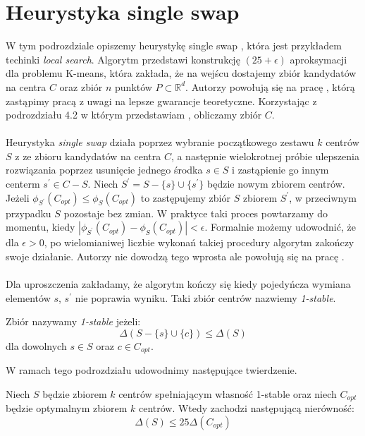 \section{Heurystyka single swap}

W tym podrozdziale opiszemy heurystykę single swap \cite{Arya2004LocalSH}, która jest przykładem techinki \textit{local search}.
Algorytm przedstawi konstrukcję $(25 + \epsilon)$ aproksymacji dla problemu K-means, która zakłada, że na wejścu dostajemy zbiór kandydatów na centra $C$ oraz zbiór $n$ punktów $P \subset \mathbb{R}^d$.
Autorzy powołują się na pracę \cite{Matousek99onapproximate}, którą zastąpimy pracą \cite{10.1145/1007352.1007400} z uwagi na lepsze gwarancje teoretyczne.
Korzystając z podrozdziału 4.2 w którym przedstawiam \cite{10.1145/1007352.1007400}, obliczamy zbiór $C$.
\\~\\
Heurystyka \textit{single swap} działa poprzez wybranie początkowego zestawu $k$ centrów $S$ z ze zbioru kandydatów na centra $C$, a następnie wielokrotnej
próbie ulepszenia rozwiązania poprzez usunięcie jednego środka $s \in S$ i zastąpienie go innym centerm $s^{'} \in C - S$.
Niech $S^{'} = S - \{s\} \cup \{s^{'}\}$ będzie nowym zbiorem centrów.
Jeżeli $\phi_{S^{'}}(C_{opt}) \leq \phi_{S}(C_{opt})$ to zastępujemy zbiór $S$ zbiorem $S^{'}$, w przeciwnym przypadku $S$ pozostaje bez zmian.
W praktyce taki proces powtarzamy do momentu, kiedy $|\phi_{S^{'}}(C_{opt}) - \phi_{S}(C_{opt})| < \epsilon$.
Formalnie możemy udowodnić, że dla $\epsilon > 0$, po wielomianiwej liczbie wykonań takiej procedury algorytm zakończy swoje działanie.
Autorzy nie dowodzą tego wprosta ale powołują się na pracę \cite{10.1145/380752.380755}.
\\~\\
Dla uproszczenia zakładamy, że algorytm kończy się kiedy pojedyńcza wymiana elementów $s$, $s^{'}$ nie poprawia wyniku.
Taki zbiór centrów nazwiemy \textit{1-stable}.
\begin{definition}
    Zbiór nazywamy \emph{1-stable} jeżeli:
    \begin{equation}
        \Delta(S - \{s\} \cup \{c\}) \leq \Delta(S)
    \end{equation}
    dla dowolnych $s \in S$ oraz $c \in C_{opt}$.
\end{definition}

\noindent
W ramach tego podrozdziału udowodnimy następujące twierdzenie.

\begin{thm}
    Niech $S$ będzie zbiorem $k$ centrów spełniającym własność 1-stable oraz niech $C_{opt}$ będzie optymalnym zbiorem $k$ centrów.
    Wtedy zachodzi następującą nierówność:
    \begin{equation}
        \Delta(S) \leq 25 \Delta(C_{opt})
    \end{equation} 
\end{thm}

